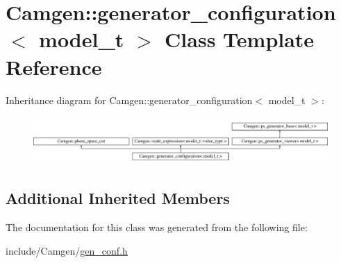 \hypertarget{a00241}{}\section{Camgen\+:\+:generator\+\_\+configuration$<$ model\+\_\+t $>$ Class Template Reference}
\label{a00241}
Inheritance diagram for Camgen\+:\+:generator\+\_\+configuration$<$ model\+\_\+t $>$\+:\begin{figure}[H]
\begin{center}
\leavevmode
\includegraphics[height=1.836066cm]{a00241}
\end{center}
\end{figure}
\subsection*{Additional Inherited Members}


The documentation for this class was generated from the following file\+:\begin{DoxyCompactItemize}
\item 
include/\+Camgen/\hyperlink{a00651}{gen\+\_\+conf.\+h}\end{DoxyCompactItemize}
